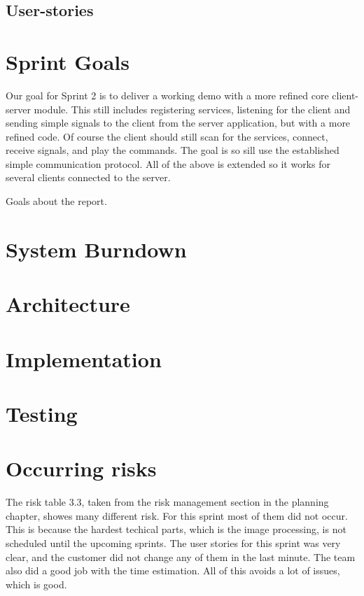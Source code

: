 \subsection{User-stories}

\section{Sprint Goals}
Our goal for Sprint 2 is to deliver a working demo with a more refined core client-server module. 
This still includes registering services, listening for the client and sending simple signals to the client from the server application, but with a more refined code. Of course the client should still scan for the services, connect, receive signals, and play the commands. 
The goal is so sill use the established simple communication protocol. All of the above is extended so it works for several clients connected to the server.

Goals about the report.

\section{System Burndown}
\section{Architecture}
\section{Implementation}
\section{Testing}


\section{Occurring risks}

The risk table 3.3, taken from the risk management section in the planning chapter, showes many different risk. 
For this sprint most of them did not occur. 
This is because the hardest techical parts, which is the image processing, is not scheduled until the upcoming sprints. 
The user stories for this sprint was very clear, and the customer did not change any of them in the last minute. The team also did a good job with the time estimation. All of this avoids a lot of issues, which is good. 

